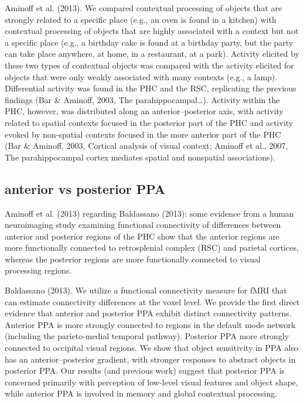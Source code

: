 \documentclass[english]{article}
\begin{document}
Aminoff et al. (2013). We compared contextual processing of
objects that are strongly related to a specific place (e.g., an oven is found in
a kitchen) with contextual processing of objects that are highly associated with
a context but not a specific place (e.g., a birthday cake is found at a birthday
party, but the party can take place anywhere, at home, in a restaurant, at a
park). Activity elicited by these two types of contextual objects was compared
with the activity elicited for objects that were only weakly associated with
many contexts (e.g., a lamp). Differential activity was found in the PHC and the
RSC, replicating the previous findings (Bar \& Aminoff, 2003, The
parahippocampal\dots).
Activity within the PHC, however, was distributed along
an anterior–posterior axis, with activity related to spatial contexts focused in
the posterior part of the PHC and activity evoked by non-spatial contexts
focused in the more anterior part of the PHC (Bar \& Aminoff, 2003, Cortical
analysis of visual context; Aminoff et al., 2007, The parahippocampal cortex
mediates spatial and nonspatial associations).

\subsection{anterior vs posterior PPA}
Aminoff et al. (2013) regarding Baldassano (2013): some evidence from a human
neuroimaging study examining functional connectivity of differences between
anterior and posterior regions of the PHC show that the anterior regions are
more functionally connected to retrosplenial complex (RSC) and parietal
cortices, whereas the posterior regions are more functionally connected to
visual processing regions.

Baldassano (2013). We utilize a functional connectivity measure for fMRI that
can estimate connectivity differences at the voxel level. We provide the first
direct evidence that anterior and posterior PPA exhibit distinct connectivity
patterns. Anterior PPA is more strongly connected to regions in the default mode
network (including the parieto-medial temporal pathway). Posterior PPA more
strongly connected to occipital visual regions.
We show that object sensitivity in PPA also has an anterior–posterior gradient,
with stronger responses to abstract objects in posterior PPA.
Our results (and previous work) suggest that posterior PPA is concerned
primarily with perception of low-level visual features and object shape, while
anterior PPA is involved in memory and global contextual processing.
\end{document}

